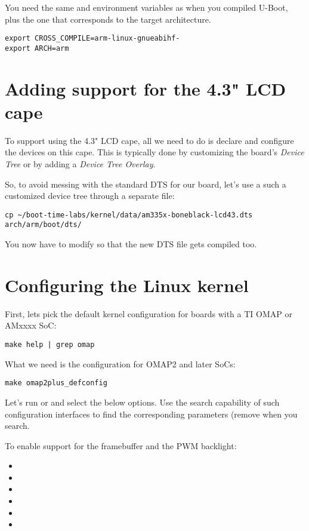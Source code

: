 You need the same  and  environment
variables as when you compiled U-Boot, plus the  one that
corresponds to the target architecture.

\begin{verbatim}
export CROSS_COMPILE=arm-linux-gnueabihf-
export ARCH=arm
\end{verbatim}

\section{Adding support for the 4.3" LCD cape}

To support using the 4.3" LCD cape, all we need to do is declare and
configure the devices on this cape. This is typically done by
customizing the board's {\em Device Tree} or by adding a {\em Device
Tree Overlay}.

So, to avoid messing with the standard DTS for our board, let's use a
such a customized device tree through a separate file:

\begin{verbatim}
cp ~/boot-time-labs/kernel/data/am335x-boneblack-lcd43.dts arch/arm/boot/dts/
\end{verbatim}

You now have to modify  so that
the new DTS file gets compiled too.

\section{Configuring the Linux kernel}

First, lets pick the default kernel configuration for boards with a TI
OMAP or AMxxxx SoC:

\begin{verbatim}
make help | grep omap
\end{verbatim}

What we need is the configuration for OMAP2 and later SoCs:
\begin{verbatim}
make omap2plus_defconfig
\end{verbatim}

Let's run  or  and select the
below options. Use the search capability of such configuration
interfaces to find the corresponding parameters (remove 
when you search.

To enable support for the framebuffer and the PWM backlight:
\begin{itemize}
\item {}
\item {}
\item {}
\item {}
\item {}
\item {}
\end{itemize}

